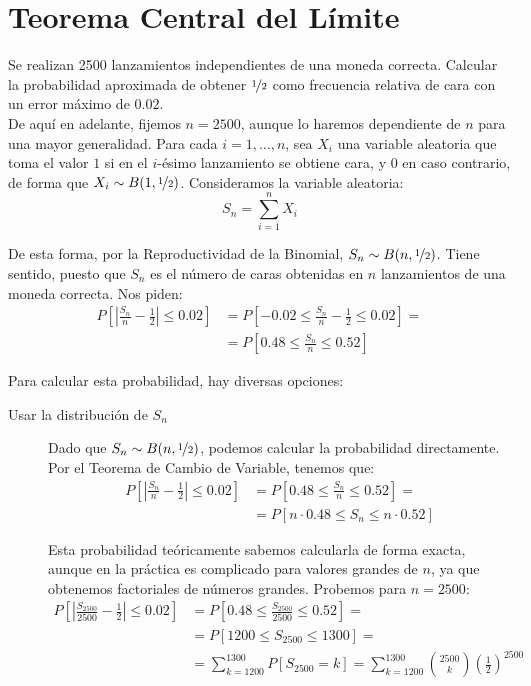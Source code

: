 \section{Teorema Central del Límite}

\begin{ejercicio}
    Se realizan 2500 lanzamientos independientes de una moneda correcta. Calcular la probabilidad aproximada de obtener $\nicefrac{1}{2}$ como frecuencia relativa de cara con un error máximo de $0.02$.\\

    De aquí en adelante, fijemos $n=2500$, aunque lo haremos dependiente de $n$ para una mayor generalidad.
    Para cada $i=1, \ldots, n$, sea $X_i$ una variable aleatoria que toma el valor $1$ si en el $i$-ésimo lanzamiento se obtiene cara, y $0$ en caso contrario, de forma que $X_i \sim B(1, \nicefrac{1}{2})$. Consideramos la variable aleatoria:
    \[
        S_{n} = \sum_{i=1}^{n} X_i
    \]

    De esta forma, por la Reproductividad de la Binomial, $S_{n} \sim B(n, \nicefrac{1}{2})$. Tiene sentido, puesto que $S_{n}$ es el número de caras obtenidas en $n$ lanzamientos de una moneda correcta.
    Nos piden:
    \begin{align*}
        P\left[\left|\frac{S_{n}}{n} - \frac{1}{2}\right| \leq 0.02\right] &= 
        P\left[-0.02 \leq \frac{S_{n}}{n} - \frac{1}{2} \leq 0.02\right]
        =\\&= P\left[0.48 \leq \frac{S_{n}}{n} \leq 0.52\right]
    \end{align*}

    Para calcular esta probabilidad, hay diversas opciones:
    \begin{description}
        \item[Usar la distribución de $S_n$] Dado que $S_{n} \sim B(n, \nicefrac{1}{2})$, podemos calcular la probabilidad directamente. Por el Teorema de Cambio de Variable, tenemos que:
        \begin{align*}
            P\left[\left|\frac{S_{n}}{n} - \frac{1}{2}\right| \leq 0.02\right] &= P\left[0.48 \leq \frac{S_{n}}{n} \leq 0.52\right]
            =\\&= P\left[n \cdot 0.48 \leq S_{n} \leq n \cdot 0.52\right]
        \end{align*}

        Esta probabilidad teóricamente sabemos calcularla de forma exacta, aunque en la práctica es complicado para valores grandes de $n$, ya que obtenemos factoriales de números grandes. Probemos para $n=2500$:
        \begin{align*}
            P\left[\left|\frac{S_{2500}}{2500} - \frac{1}{2}\right| \leq 0.02\right] &= P\left[0.48 \leq \frac{S_{2500}}{2500} \leq 0.52\right]
            =\\&= P\left[1200 \leq S_{2500} \leq 1300\right]
            =\\&= \sum_{k=1200}^{1300} P[S_{2500} = k]
            = \sum_{k=1200}^{1300} \binom{2500}{k} \left(\frac{1}{2}\right)^{2500}
        \end{align*}


\end{description}
\end{ejercicio}
